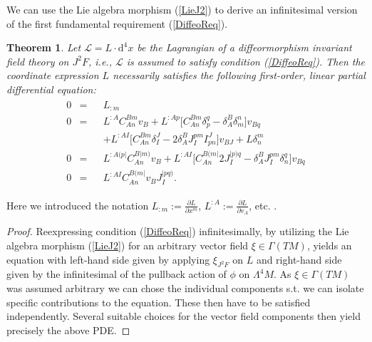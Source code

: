 \documentclass[%
 reprint,
nofootinbib,
 amsmath,amssymb,
 aps,
 prd,
floatfix,
]{revtex4-2}
\newtheorem{theorem}{Theorem}
\begin{document}
We can use the Lie algebra morphism (\ref{LieJ2}) to derive an infinitesimal version of the first fundamental requirement (\ref{DiffeoReq}).
\begin{theorem}
Let $\mathcal{L} = L \cdot \mathrm{d}^4x$ be the Lagrangian of a diffeormorphism invariant field theory on $J^2F$, i.e., $\mathcal{L}$ is assumed to satisfy condition (\ref{DiffeoReq}). Then the coordinate expression $L$ necessarily satisfies the following first-order, linear partial differential equation:  
\begin{align}\label{DiffeoEqn}
\begin{aligned}
    0 &= &&L_{:m} \\
    0 &= &&L^{:A} C_{An}^{Bm} v_B + L^{:Ap} \bigl[ C_{An}^{Bm} \delta_p^q - \delta_A^B \delta_m^n \bigr] v_{Bq}\\
    & &&+ L^{:AI} \bigl[ C_{An}^{Bm} \delta_I^J - 2 \delta_A^B J_I^{pm} I^J_{pn}  \bigr] v_{BJ} + L \delta^m_n \\
    0 &= &&L^{:A(p\vert}C_{An}^{B \vert m)} v_B + L^{: AI} \bigl[ C_{An}^{B(m\vert} 2 J_I^{\vert p) q} - \delta^B_A J_I ^{pm} \delta_n^q \bigr] v_{Bq} \\
    0 &= &&L^{:AI} C_{An}^{B(m\vert} v_B J_I^{\vert p q )}.
\end{aligned}
\end{align}
\end{theorem}
Here we introduced the notation $L_{:m} := \frac{\partial L}{\partial x^m}$, $L^{:A} := \frac{\partial L}{ \partial v_A}$, etc. .
\begin{proof}
Reexpressing condition (\ref{DiffeoReq}) infinitesimally, by utilizing the Lie algebra morphism (\ref{LieJ2}) for an arbitrary vector field $\xi \in \Gamma(TM)$, yields an equation with left-hand side given by applying $\xi_{J^2F}$ on $L$ and right-hand side given by the infinitesimal of the pullback action of $\phi$ on $\Lambda^4M$.
As $\xi \in \Gamma(TM)$ was assumed arbitrary we can chose the individual components s.t. we can isolate specific contributions to the equation. These then have to be satisfied independently. Several suitable choices for the vector field components then yield precisely the above PDE. 
\end{proof}
\end{document}
